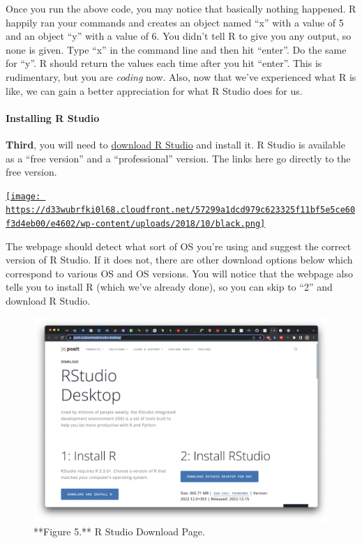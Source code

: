 \documentclass[
]{article}
\begin{document}
\hfill\break

Once you run the above code, you may notice that basically nothing
happened. R happily ran your commands and creates an object named ``x''
with a value of 5 and an object ``y'' with a value of 6. You didn't tell
R to give you any output, so none is given. Type ``x'' in the command
line and then hit ``enter''. Do the same for ``y''. R should return the
values each time after you hit ``enter''. This is rudimentary, but you
are \emph{coding} now. Also, now that we've experienced what R is like,
we can gain a better appreciation for what R Studio does for us.

\hfill\break
\hfill\break

\hypertarget{installing-r-studio}{%
\paragraph{Installing R Studio}\label{installing-r-studio}}

\textbf{Third}, you will need to
\href{https://posit.co/download/rstudio-desktop/}{download R Studio} and
install it. R Studio is available as a ``free version'' and a
``professional'' version. The links here go directly to the free
version.

\href{https://posit.co/downloads/}{\texttt{[image: https://d33wubrfki0l68.cloudfront.net/57299a1dcd979c623325f11bf5e5ce60f3d4eb00/e4602/wp-content/uploads/2018/10/black.png]}}

The webpage should detect what sort of OS you're using and suggest the
correct version of R Studio. If it does not, there are other download
options below which correspond to various OS and OS versions. You will
notice that the webpage also tells you to install R (which we've already
done), so you can skip to ``2'' and download R Studio.

\begin{figure}

{\centering \includegraphics{images/R_studio-DL} 

}

\caption{**Figure 5.** R Studio Download Page.}\label{fig:sceenshot of R Studio Download page}
\end{figure}
\end{document}
